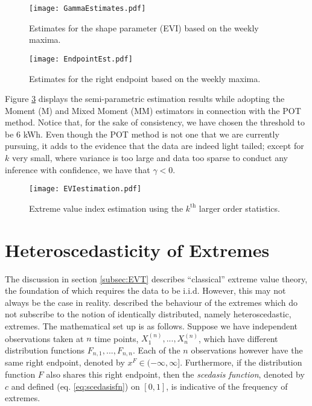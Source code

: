 \begin{figure}
\begin{center}
\texttt{[image: GammaEstimates.pdf]}
\caption{Estimates for the shape parameter (EVI) based on the weekly maxima.} \label{fig:gammaEst}
\end{center}
\end{figure}

\begin{figure}
\begin{center}
\texttt{[image: EndpointEst.pdf]}
\caption{Estimates for the right endpoint based on the weekly maxima.} \label{fig:EndPointEst}
\end{center}
\end{figure}

Figure \ref{fig:POTEst} displays the semi-parametric estimation results while adopting the Moment (M) and Mixed Moment (MM) estimators in connection with the POT method. Notice that, for the sake of consistency, we have chosen the threshold to be 6 kWh. Even though the POT method is not one that we are currently pursuing, it adds to the evidence that the data are indeed light tailed; except for $k$ very small, where variance is too large and data too sparse to conduct any inference with confidence, we have that $\gamma < 0$.

\begin{figure}
\begin{center}
\texttt{[image: EVIestimation.pdf]}
\caption{Extreme value index estimation using the $k^{\text{th}}$ larger order statistics.} \label{fig:POTEst}
\end{center}
\end{figure}

\section{Heteroscedasticity of Extremes} \label{subsec:sced}

The discussion in section \ref{subsec:EVT} describes ``classical'' extreme value theory, the foundation of which requires the data to be i.i.d. However, this may not always be the case in reality. \cite{einmahl16} described the behaviour of the extremes which do not subscribe to the notion of identically distributed, namely heteroscedastic, extremes. The mathematical set up is as follows. Suppose we have independent observations taken at $n$ time points, $X_1^{(n)} , ... , X_n^{(n)}$, which have different distribution functions $F_{n,1}, ... , F_{n,n}$. Each of the $n$ observations however have the same right endpoint, denoted by $x^F \in (-\infty, \infty]$. Furthermore, if the distribution function $F$ also shares this right endpoint, then the \textit{scedasis function}, denoted by $c$ and defined (eq. \ref{eq:scedasisfn}) on $[0,1]$, is indicative of the frequency of extremes.

